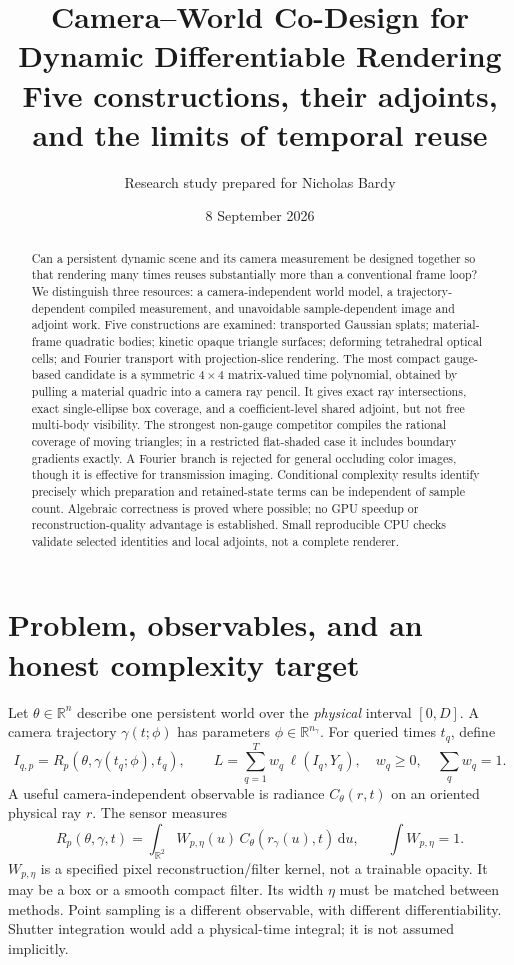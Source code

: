 \documentclass[10pt,letterpaper]{article}
\title{\vspace{-1.5em}\bfseries Camera--World Co-Design for Dynamic Differentiable Rendering\\[0.4em]\large Five constructions, their adjoints, and the limits of temporal reuse}
\author{Research study prepared for Nicholas Bardy}
\date{8 September 2026}
\theoremstyle{remark}\newtheorem{counterexample}[proposition]{Counterexample}
\newcommand{\R}{\mathbb R}
\newcommand{\dd}{\,\mathrm d}
\begin{document}
\maketitle\vspace{-1.2em}
\begin{abstract}
Can a persistent dynamic scene and its camera measurement be designed together so that rendering many times reuses substantially more than a conventional frame loop? We distinguish three resources: a camera-independent world model, a trajectory-dependent compiled measurement, and unavoidable sample-dependent image and adjoint work. Five constructions are examined: transported Gaussian splats; material-frame quadratic bodies; kinetic opaque triangle surfaces; deforming tetrahedral optical cells; and Fourier transport with projection-slice rendering. The most compact gauge-based candidate is a symmetric $4\times4$ matrix-valued time polynomial, obtained by pulling a material quadric into a camera ray pencil. It gives exact ray intersections, exact single-ellipse box coverage, and a coefficient-level shared adjoint, but not free multi-body visibility. The strongest non-gauge competitor compiles the rational coverage of moving triangles; in a restricted flat-shaded case it includes boundary gradients exactly. A Fourier branch is rejected for general occluding color images, though it is effective for transmission imaging. Conditional complexity results identify precisely which preparation and retained-state terms can be independent of sample count. Algebraic correctness is proved where possible; no GPU speedup or reconstruction-quality advantage is established. Small reproducible CPU checks validate selected identities and local adjoints, not a complete renderer.
\end{abstract}

\section{Problem, observables, and an honest complexity target}

Let $\theta\in\R^n$ describe one persistent world over the \emph{physical} interval $[0,D]$. A camera trajectory $\gamma(t;\phi)$ has parameters $\phi\in\R^{n_\gamma}$. For queried times $t_q$, define
\begin{equation}
 I_{q,p}=R_p(\theta,\gamma(t_q;\phi),t_q),\qquad
 L=\sum_{q=1}^{T}w_q\,\ell(I_q,Y_q),\quad w_q\geq0,\quad\sum_qw_q=1.
 \label{eq:problem}
\end{equation}
A useful camera-independent observable is radiance $C_\theta(r,t)$ on an oriented physical ray $r$. The sensor measures
\begin{equation}
 R_p(\theta,\gamma,t)=\int_{\R^2} W_{p,\eta}(u)\,
 C_\theta(r_\gamma(u),t)\dd u,\qquad \int W_{p,\eta}=1.
 \label{eq:sensor}
\end{equation}
$W_{p,\eta}$ is a specified pixel reconstruction/filter kernel, not a trainable opacity. It may be a box or a smooth compact filter. Its width $\eta$ must be matched between methods. Point sampling is a different observable, with different differentiability. Shutter integration would add a physical-time integral; it is not assumed implicitly.
\end{document}
